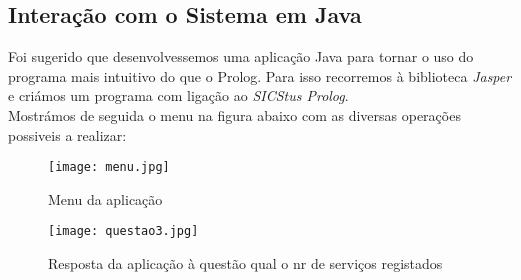 \subsection{Interação com o Sistema em Java}
Foi sugerido que desenvolvessemos uma aplicação Java para tornar o uso do programa mais intuitivo do que o Prolog. Para isso recorremos à biblioteca \textit{Jasper} e criámos um programa com ligação ao \textit{SICStus Prolog}. \\

Mostrámos de seguida o menu na figura abaixo com as diversas operações possiveis a realizar: 

\begin{figure}[<+h+>]
	\centering
	\texttt{[image: menu.jpg]}
	\caption{Menu da aplicação}
\end{figure}

\begin{figure}[<+h+>]
	\centering
	\texttt{[image: questao3.jpg]}
	\caption{Resposta da aplicação à questão qual o nr de serviços registados}
\end{figure}





